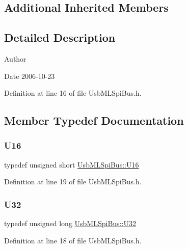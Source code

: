 \subsection*{Additional Inherited Members}


\subsection{Detailed Description}
\begin{DoxyAuthor}{Author}

\end{DoxyAuthor}
\begin{DoxyDate}{Date}
2006-\/10-\/23 
\end{DoxyDate}


Definition at line 16 of file Usb\+M\+L\+Spi\+Bus.\+h.



\subsection{Member Typedef Documentation}
\mbox{\label{classUsbMLSpiBus_a99eae888c884460a5652b6e26d235886}} 
\subsubsection{\texorpdfstring{U16}{U16}}
{\footnotesize\ttfamily typedef unsigned short \hyperlink{classUsbMLSpiBus_a99eae888c884460a5652b6e26d235886}{Usb\+M\+L\+Spi\+Bus\+::\+U16}}



Definition at line 19 of file Usb\+M\+L\+Spi\+Bus.\+h.

\mbox{\label{classUsbMLSpiBus_a9b33e21d66212d15ad6e88e85bfe645a}} 
\subsubsection{\texorpdfstring{U32}{U32}}
{\footnotesize\ttfamily typedef unsigned long \hyperlink{classUsbMLSpiBus_a9b33e21d66212d15ad6e88e85bfe645a}{Usb\+M\+L\+Spi\+Bus\+::\+U32}}



Definition at line 18 of file Usb\+M\+L\+Spi\+Bus.\+h.

